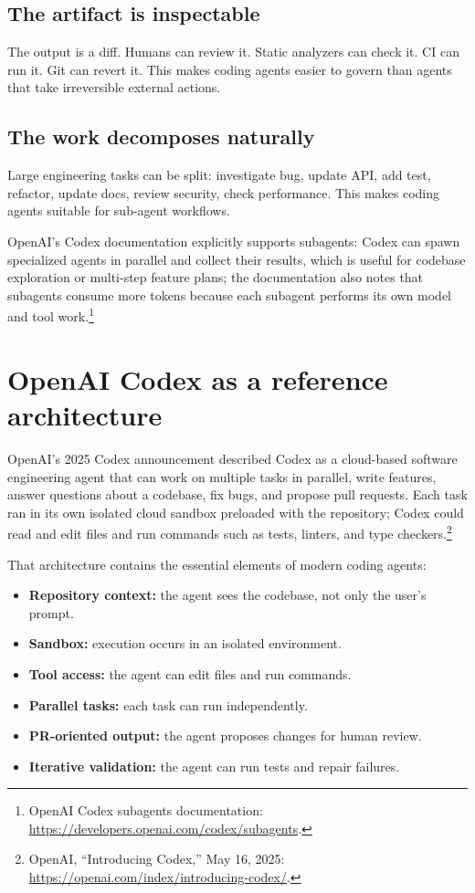 \subsection{The artifact is inspectable}

The output is a diff. Humans can review it. Static analyzers can check it. CI can run it. Git can revert it. This makes coding agents easier to govern than agents that take irreversible external actions.

\subsection{The work decomposes naturally}

Large engineering tasks can be split: investigate bug, update API, add test, refactor, update docs, review security, check performance. This makes coding agents suitable for sub-agent workflows.

OpenAI's Codex documentation explicitly supports subagents: Codex can spawn specialized agents in parallel and collect their results, which is useful for codebase exploration or multi-step feature plans; the documentation also notes that subagents consume more tokens because each subagent performs its own model and tool work.\footnote{OpenAI Codex subagents documentation: \url{https://developers.openai.com/codex/subagents}.}

\section{OpenAI Codex as a reference architecture}

OpenAI's 2025 Codex announcement described Codex as a cloud-based software engineering agent that can work on multiple tasks in parallel, write features, answer questions about a codebase, fix bugs, and propose pull requests. Each task ran in its own isolated cloud sandbox preloaded with the repository; Codex could read and edit files and run commands such as tests, linters, and type checkers.\footnote{OpenAI, ``Introducing Codex,'' May 16, 2025: \url{https://openai.com/index/introducing-codex/}.}

That architecture contains the essential elements of modern coding agents:

\begin{itemize}[leftmargin=*]
  \item \textbf{Repository context:} the agent sees the codebase, not only the user's prompt.
  \item \textbf{Sandbox:} execution occurs in an isolated environment.
  \item \textbf{Tool access:} the agent can edit files and run commands.
  \item \textbf{Parallel tasks:} each task can run independently.
  \item \textbf{PR-oriented output:} the agent proposes changes for human review.
  \item \textbf{Iterative validation:} the agent can run tests and repair failures.
\end{itemize}

